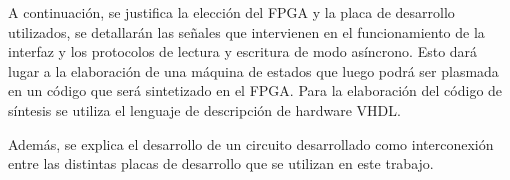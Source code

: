 A continuación, se justifica la elección del FPGA y la placa de desarrollo utilizados, se detallarán las señales que intervienen en el funcionamiento de la interfaz y los protocolos de lectura y escritura de modo asíncrono. Esto dará lugar a la elaboración de una máquina de estados que luego podrá ser plasmada en un código que será sintetizado en el FPGA. Para la elaboración del código de síntesis se utiliza el lenguaje de descripción de hardware VHDL.

Además, se explica el desarrollo de un circuito desarrollado como interconexión entre las distintas placas de desarrollo que se utilizan en este trabajo.

